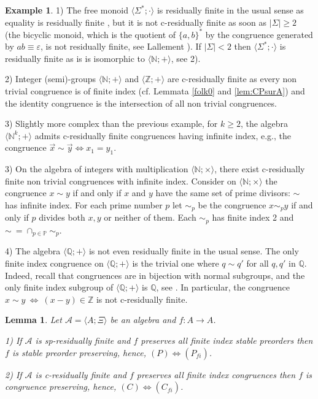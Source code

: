 \documentclass[11pt,a4paper]{article}
\newtheorem{lemma}[theorem]{Lemma}
\theoremstyle{definition} %
\newtheorem{example}[theorem]{Example}
\newcommand\+[1]{\mathcal{#1}} %
\newcommand{\N}{{\mathbb N}}     %
\newcommand{\PP}{{\mathbb P}}    %
\newcommand{\Z}{{\mathbb Z}}     %
\newcommand{\Q}{{\mathbb Q}}     %
\begin{document}
\begin{example}\label{ex:PrimeSupport}
 1)  The free monoid $\langle \Sigma^*;\cdot\rangle$ is residually finite in the usual sense as equality is residually finite \cite{resfinite}, but it is not c-residually finite as soon as  $|\Sigma|\geq 2$ (the bicyclic monoid, which is the quotient  of $\{a,b\}^*$ by the congruence generated by $ab\equiv \varepsilon$, is not residually finite, see Lallement \cite{Lallement}). If $|\Sigma|< 2$ then $\langle \Sigma^*;\cdot\rangle$ is residually finite as is is isomorphic to $\langle \N;+\rangle$, see 2).
 
 2) Integer (semi)-groups $\langle \N;+\rangle$ and $\langle \Z;+\rangle$ 
are c-residually finite as every non trivial congruence is of finite index (cf.\!  Lemmata \ref{folk0} and \ref{lem:CPsurA}) and the identity congruence is the intersection of all non trivial congruences. 


3)  Slightly more complex than the previous example, for $k\geq 2$,
the algebra $\langle \N^k;+\rangle$ admits c-residually finite congruences having infinite index, e.g., the congruence $\vec{x}\sim \vec{y} \Leftrightarrow x_1= y_1$. 

3) On the algebra of integers with multiplication 
$\langle \N;\times\rangle$, there exist c-residually finite non trivial congruences with  infinite index.  Consider on $\langle \N;\times\rangle$  the congruence $x\sim  y$ if and only if $x$ and $y$ have the same set of prime divisors:  $\sim $ has infinite index.  For each prime number $p$ let $\sim _p$ be the congruence $x\sim_p y$ if and only if $p$ divides both $x,y$ or neither of them. Each $\sim _p$ has finite index 2 and $\sim\  =\cap_{p\in \PP} \sim _p$.

 4) The algebra $\langle \Q;+\rangle$ is not  even residually finite in the usual sense. The only finite index congruence on $\langle \Q;+\rangle$ is the trivial one where $q\sim q'$ for all $q,q'$ in $\Q$. Indeed, recall that congruences are in bijection with normal subgroups, and the only finite index subgroup of $\langle \Q;+\rangle$ is $\Q$, see \cite{resinfinite}. In particular, the  congruence $x\sim y \ \Longleftrightarrow \   (x-y) \in \Z$ is not c-residually finite.
\end{example}
%
\begin{lemma}\label{l:residually finite utile}
Let $\+A = \langle A;\Xi\rangle$ be an algebra and $f:A\to A$.

1) If $\+A$ is sp-residually  finite and  $f$ preserves all finite index stable preorders then $f$ is stable preorder preserving, hence, $(P)\Longleftrightarrow(P_{\textit{fi}})$.

2) If $\+A$ is c-residually finite and $f$ preserves all finite index congruences then $f$ is congruence preserving, hence, $(C)\Longleftrightarrow(C_{\textit{fi}})$.
\end{lemma}
\end{document}
